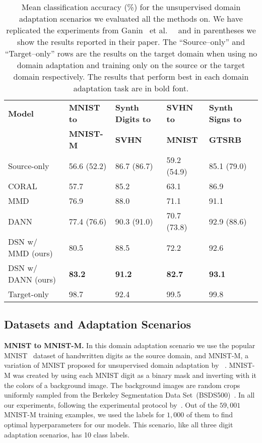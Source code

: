 \documentclass{article}
\newcommand{\etal}{~et al.~}
\begin{document}
\begin{table}[t]
\centering
\caption{Mean classification accuracy (\%) for the unsupervised domain adaptation scenarios we evaluated all the methods on. We have replicated the experiments from Ganin \etal~\protect\cite{ganin2016domain} and in parentheses we show the results reported in their paper. The ``Source--only'' and ``Target--only'' rows are the results on the target domain when  using no domain adaptation and training only on the source or the target domain respectively. The results that perform best in each domain adaptation task are in bold font.}
\vspace{2mm}
\label{tab:results}
\begin{tabular}{ | l | l | l | l | l | }
\hline
\bf Model   & \bf MNIST to & \bf Synth Digits to &\bf SVHN to  &\bf Synth Signs to \\
 &\bf MNIST-M  &\bf SVHN        &\bf MNIST &\bf GTSRB     \\ \hline \hline
Source-only  & 56.6 (52.2) & 86.7 (86.7)      & 59.2 (54.9) & 85.1  (79.0)    \\ \hline \hline
CORAL \cite{sun2015return} & 57.7 & 85.2       &  63.1     & 86.9        \\ \hline
MMD  \cite{tzeng2015ddc,long2015learning}  & 76.9 & 88.0 & 71.1 & 91.1 \\ \hline 
DANN \cite{ganin2016domain}  & 77.4 (76.6)  &  90.3 (91.0)    & 70.7 (73.8)  &     92.9 (88.6) \\ \hline
DSN w/ MMD (ours)  & 80.5 & 88.5  & 72.2   & 92.6 \\ \hline
DSN w/ DANN (ours) & \textbf{83.2} & \textbf{91.2} & \textbf{82.7} & \textbf{93.1} \\ \hline\hline
Target-only  & 98.7 & 92.4  & 99.5 & 99.8  \\ \hline
\end{tabular}
\end{table}



\subsection{Datasets and Adaptation Scenarios}
\textbf{MNIST to MNIST-M.} In this domain adaptation scenario we use the popular MNIST~\cite{lecun1998gradient} dataset of handwritten digits as the source domain, and MNIST-M, a variation of MNIST proposed for unsupervised domain adaptation by ~\cite{ganin2016domain}. MNIST-M was created by using each MNIST digit as a binary mask and inverting with it the colors of a background image. The background images are random crops uniformly sampled from the Berkeley Segmentation Data Set~(BSDS500)~\cite{arbelaez2011contour}.  In all our experiments, following the experimental protocol by~\cite{ganin2016domain}. Out of the $59,001$ MNIST-M training examples, we used the labels for $1,000$ of them to find optimal hyperparameters for our models. This scenario, like all three digit adaptation scenarios, has 10 class labels.
\end{document}
